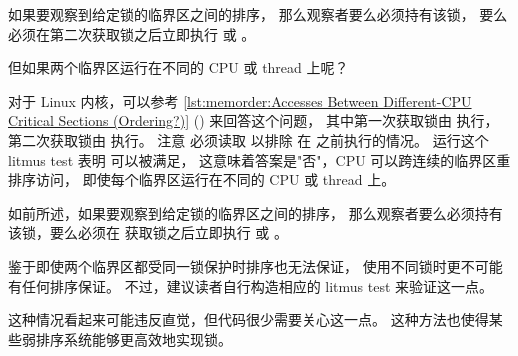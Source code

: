 如果要观察到给定锁的临界区之间的排序，
那么观察者要么必须持有该锁，
要么必须在第二次获取锁之后立即执行
 或 。

但如果两个临界区运行在不同的 CPU 或 thread 上呢？

\begin{listing}

\caption{不同CPU临界区之间的访问（有排序吗？）}
\label{lst:memorder:Accesses Between Different-CPU Critical Sections (Ordering?)}
\end{listing}

对于 Linux 内核，可以参考
\cref{lst:memorder:Accesses Between Different-CPU Critical Sections (Ordering?)}
() 来回答这个问题，
其中第一次获取锁由  执行，
第二次获取锁由  执行。
注意  必须读取  以排除
 在  之前执行的情况。
运行这个 litmus test 表明  可以被满足，
这意味着答案是"否"，CPU 可以跨连续的临界区重排序访问，
即使每个临界区运行在不同的 CPU 或 thread 上。

\QuickQuizEnd

如前所述，如果要观察到给定锁的临界区之间的排序，
那么观察者要么必须持有该锁，要么必须在
 获取锁之后立即执行
 或 。

鉴于即使两个临界区都受同一锁保护时排序也无法保证，
使用不同锁时更不可能有任何排序保证。
不过，建议读者自行构造相应的 litmus test 来验证这一点。

这种情况看起来可能违反直觉，但代码很少需要关心这一点。
这种方法也使得某些弱排序系统能够更高效地实现锁。

